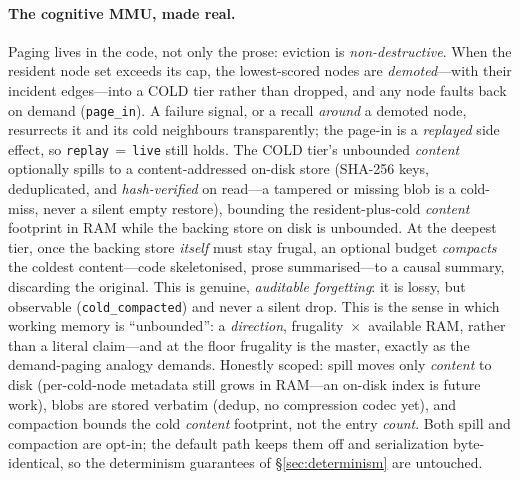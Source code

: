 \documentclass[11pt]{article}
\newcommand{\code}[1]{\texttt{#1}}
\begin{document}
\paragraph{The cognitive MMU, made real.} Paging lives in the code, not only the
prose: eviction is \emph{non-destructive}. When the resident node set exceeds its
cap, the lowest-scored nodes are \emph{demoted}---with their incident edges---into
a COLD tier rather than dropped, and any node faults back on demand
(\code{page\_in}). A failure signal, or a recall \emph{around} a demoted node,
resurrects it and its cold neighbours transparently; the page-in is a
\emph{replayed} side effect, so \mbox{\code{replay}\,$=$\,\code{live}} still holds.
The COLD tier's unbounded \emph{content} optionally spills to a content-addressed
on-disk store (SHA-256 keys, deduplicated, and \emph{hash-verified} on read---a
tampered or missing blob is a cold-miss, never a silent empty restore), bounding
the resident-plus-cold \emph{content} footprint in RAM while the backing store on
disk is unbounded. At the deepest tier, once the backing store \emph{itself} must
stay frugal, an optional budget \emph{compacts} the coldest content---code
skeletonised, prose summarised---to a causal summary, discarding the original. This
is genuine, \emph{auditable forgetting}: it is lossy, but observable
(\code{cold\_compacted}) and never a silent drop. This is the sense in which working
memory is ``unbounded'': a \emph{direction}, frugality~$\times$~available RAM, rather
than a literal claim---and at the floor frugality is the master, exactly as the
demand-paging analogy demands. Honestly scoped: spill moves only \emph{content} to
disk (per-cold-node metadata still grows in RAM---an on-disk index is future work),
blobs are stored verbatim (dedup, no compression codec yet), and compaction bounds
the cold \emph{content} footprint, not the entry \emph{count}. Both spill and
compaction are opt-in; the default path keeps them off and serialization
byte-identical, so the determinism guarantees of \S\ref{sec:determinism} are
untouched.
\end{document}
